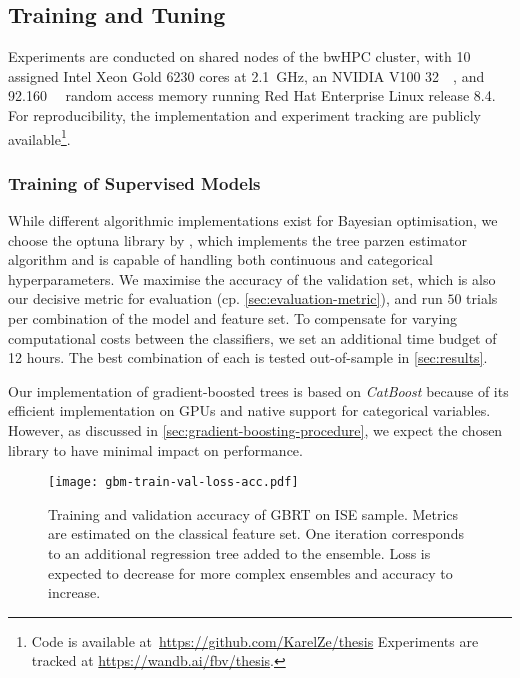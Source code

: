 \subsection{Training and Tuning}\label{sec:training-and-tuning}

Experiments are conducted on shared nodes of the bwHPC cluster, with 10 assigned Intel Xeon Gold 6230 cores at \SI{2.1}{\GHz}, an NVIDIA V100 \SI{32}{\giga\byte}, and \SI{92.160}{\giga\byte} random access memory running Red Hat Enterprise Linux release 8.4. For reproducibility, the implementation and experiment tracking are publicly available\footnote{Code is available at~\url{https://github.com/KarelZe/thesis} Experiments are tracked at \url{https://wandb.ai/fbv/thesis}.}.

\subsubsection{Training of Supervised
    Models}\label{sec:training-of-supervised-models}

While different algorithmic implementations exist for Bayesian optimisation, we choose the optuna library by \textcite[][1--10]{akibaOptunaNextgenerationHyperparameter2019}, which implements the tree parzen estimator algorithm and is capable of handling both continuous and categorical hyperparameters. We maximise the accuracy of the validation set, which is also our decisive metric for evaluation (cp. \cref{sec:evaluation-metric}), and run $50$ trials per combination of the model and feature set. To compensate for varying computational costs between the classifiers, we set an additional time budget of 12 hours. The best combination of each is tested out-of-sample in \cref{sec:results}.

Our implementation of gradient-boosted trees is based on \emph{CatBoost} \autocite[][5--6]{prokhorenkovaCatBoostUnbiasedBoosting2018} because of its efficient implementation on \glspl{GPU} and native support for categorical variables. However, as discussed in \cref{sec:gradient-boosting-procedure}, we expect the chosen library to have minimal impact on performance.

\begin{figure}[ht]
    \centering
    \texttt{[image: gbm-train-val-loss-acc.pdf]}
    \caption[Training and Validation Accuracy of  on  Sample]{Training and validation accuracy of \gls{GBRT} on \gls{ISE} sample. Metrics are estimated on the classical feature set. One iteration corresponds to an additional regression tree added to the ensemble. Loss is expected to decrease for more complex ensembles and accuracy to increase.}
    \label{fig:gbm-train-val-loss-acc}
\end{figure}

